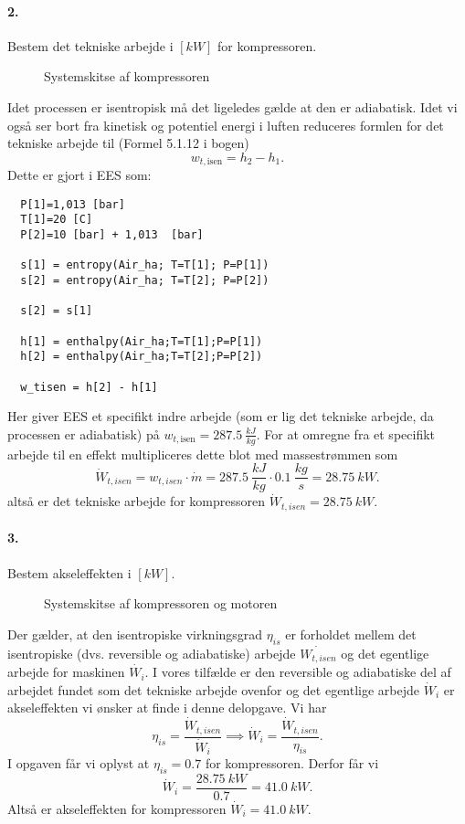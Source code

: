 \documentclass[a4paper]{article}
\begin{document}
\paragraph{2.} Bestem det tekniske arbejde i $[\unit{kW}]$ for kompressoren.
\begin{figure}[ht]
    \centering
    \caption{Systemskitse af kompressoren}
\end{figure}
\bigbreak
Idet processen er isentropisk må det ligeledes gælde at den er adiabatisk. Idet vi også ser bort fra kinetisk og potentiel energi i luften reduceres formlen for det tekniske arbejde til (Formel 5.1.12 i bogen)
\[ 
w_{t, \mathrm{isen}} = h_2 - h_1
.\]
Dette er gjort i EES som:
\begin{verbatim}
  P[1]=1,013 [bar]
  T[1]=20 [C]
  P[2]=10 [bar] + 1,013  [bar] 
  
  s[1] = entropy(Air_ha; T=T[1]; P=P[1])
  s[2] = entropy(Air_ha; T=T[2]; P=P[2])
 
  s[2] = s[1]

  h[1] = enthalpy(Air_ha;T=T[1];P=P[1])
  h[2] = enthalpy(Air_ha;T=T[2];P=P[2])
 
  w_tisen = h[2] - h[1]
\end{verbatim}
Her giver EES et specifikt indre arbejde (som er lig det tekniske arbejde, da processen er adiabatisk) på $w_{t,\mathrm{isen}} = \qty{287,5}{\frac{kJ}{kg}}$. For at omregne fra et specifikt arbejde til en effekt multipliceres dette blot med massestrømmen som
\[ 
  \dot{W}_{t, isen} = w_{t, isen} \cdot \dot{m} = \qty{287,5}{\frac{kJ}{kg}} \cdot \qty{0,1}{\frac{kg}{s}} = \qty{28,75}{kW}
.\]
altså er det tekniske arbejde for kompressoren $\dot{W}_{t, isen} = \qty{28,75}{kW}$.


\paragraph{3.} Bestem akseleffekten i $[\unit{kW}]$.
\begin{figure}[ht]
    \centering
    \caption{Systemskitse af kompressoren og motoren}
\end{figure}
\bigbreak
Der gælder, at den isentropiske virkningsgrad $\eta_{is}$ er forholdet mellem det isentropiske (dvs. reversible og adiabatiske) arbejde $\dot{W_{t, isen}}$ og det egentlige arbejde for maskinen $\dot{W_i}$. I vores tilfælde er den reversible og adiabatiske del af arbejdet fundet som det tekniske arbejde ovenfor og det egentlige arbejde $\dot{W}_i$ er akseleffekten vi ønsker at finde i denne delopgave. Vi har
\[ 
\eta_{is} = \frac{\dot{W}_{t, isen}}{\dot{W}_i} \implies \dot{W}_i = \frac{\dot{W}_{t,isen}}{\eta_{is}}
.\]
I opgaven får vi oplyst at $\eta_{is}= \num{0,7}$ for kompressoren. Derfor får vi
\[ 
\dot{W}_i = \frac{\qty{28,75}{kW}}{\num{0,7}} = \qty{41,0}{kW} 
.\]
Altså er akseleffekten for kompressoren $\dot{W}_i = \qty{41,0}{kW}$.
\end{document}

